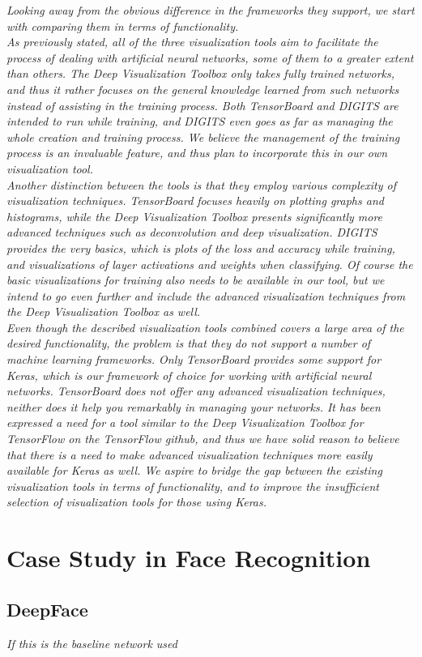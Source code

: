 \textit{Looking away from the obvious difference in the frameworks they support, we start with comparing them in terms of functionality.} \\

\noindent \textit{As previously stated, all of the three visualization tools aim to facilitate the process of dealing with artificial neural networks, some of them to a greater extent than others. The Deep Visualization Toolbox only takes fully trained networks, and thus it rather focuses on the general knowledge learned from such networks instead of assisting in the training process. Both TensorBoard and DIGITS are intended to run while training, and DIGITS even goes as far as managing the whole creation and training process. We believe the management of the training process is an invaluable feature, and thus plan to incorporate this in our own visualization tool.} \\

\noindent \textit{Another distinction between the tools is that they employ various complexity of visualization techniques. TensorBoard focuses heavily on plotting graphs and histograms, while the Deep Visualization Toolbox presents significantly more advanced techniques such as deconvolution and deep visualization. DIGITS provides the very basics, which is plots of the loss and accuracy while training, and visualizations of layer activations and weights when classifying. Of course the basic visualizations for training also needs to be available in our tool, but we intend to go even further and include the advanced visualization techniques from the Deep Visualization Toolbox as well.} \\

\noindent \textit{Even though the described visualization tools combined covers a large area of the desired functionality, the problem is that they do not support a number of machine learning frameworks. Only TensorBoard provides some support for Keras, which is our framework of choice for working with artificial neural networks. TensorBoard does not offer any advanced visualization techniques, neither does it help you remarkably in managing your networks. It has been expressed a need for a tool similar to the Deep Visualization Toolbox for TensorFlow on the TensorFlow github, and thus we have solid reason to believe that there is a need to make advanced visualization techniques more easily available for Keras as well. We aspire to bridge the gap between the existing visualization tools in terms of functionality, and to improve the insufficient selection of visualization tools for those using Keras.}

\begin{comment}
Things that could be added:
- tensorboard and digits are still being worked on. deepvis not so much
- keyword is live / real-time
\end{comment}

\section{Case Study in Face Recognition}

\subsection{DeepFace}

\textit{If this is the baseline network used}

\cleardoublepage